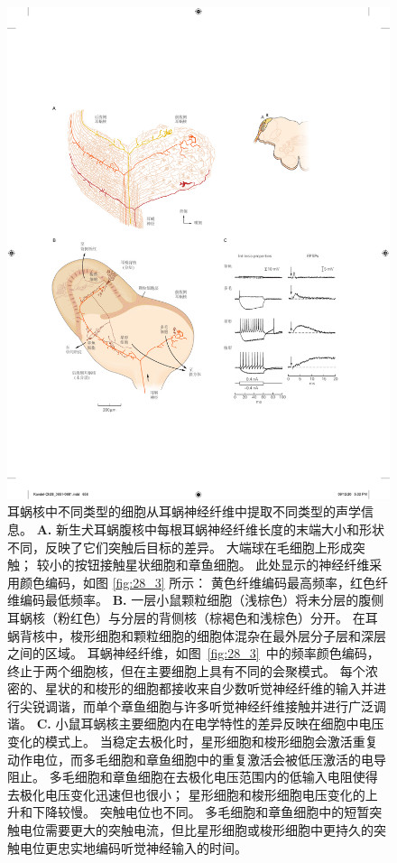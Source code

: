 \begin{figure}[htbp]
	\centering
	\includegraphics[width=1.0\linewidth]{chap28/fig_28_4}
	\caption{耳蜗核中不同类型的细胞从耳蜗神经纤维中提取不同类型的声学信息。
		\textbf{A.} 新生犬耳蜗腹核中每根耳蜗神经纤维长度的末端大小和形状不同，反映了它们突触后目标的差异。 
		大端球在毛细胞上形成突触； 
		较小的按钮接触星状细胞和章鱼细胞。 
		此处显示的神经纤维采用颜色编码，如图 \ref{fig:28_3} 所示：
		黄色纤维编码最高频率，红色纤维编码最低频率\cite{y1909histologie}。
		\textbf{B.} 一层小鼠颗粒细胞（浅棕色）将未分层的腹侧耳蜗核（粉红色）与分层的背侧核（棕褐色和浅棕色）分开。 
		在耳蜗背核中，梭形细胞和颗粒细胞的细胞体混杂在最外层分子层和深层之间的区域。
		耳蜗神经纤维，如图~\ref{fig:28_3}~中的频率颜色编码，终止于两个细胞核，但在主要细胞上具有不同的会聚模式。
		每个浓密的、星状的和梭形的细胞都接收来自少数听觉神经纤维的输入并进行尖锐调谐，而单个章鱼细胞与许多听觉神经纤维接触并进行广泛调谐。
		\textbf{C.} 小鼠耳蜗核主要细胞内在电学特性的差异反映在细胞中电压变化的模式上。
		当稳定去极化时，星形细胞和梭形细胞会激活重复动作电位，而多毛细胞和章鱼细胞中的重复激活会被低压激活的电导阻止。
		多毛细胞和章鱼细胞在去极化电压范围内的低输入电阻使得去极化电压变化迅速但也很小； 
		星形细胞和梭形细胞电压变化的上升和下降较慢。
		突触电位也不同。
		多毛细胞和章鱼细胞中的短暂突触电位需要更大的突触电流，但比星形细胞或梭形细胞中更持久的突触电位更忠实地编码听觉神经输入的时间。}
	\label{fig:28_4}
\end{figure}


